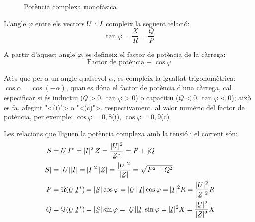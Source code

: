 \begin{figure}[htb]
\centering
{}
\caption{Pot\`{e}ncia complexa monof\`{a}sica} \label{pic:pot_comp_mono}
\end{figure}

L'angle $\varphi$ entre els vectors $\cmplx{U}$ i $\cmplx{I}$ compleix la seg\"{u}ent relaci\'{o}:
\begin{equation}
   \tan\varphi = \frac{X}{R} = \frac{Q}{P}
\end{equation}

A partir d'aquest angle $\varphi$, es defineix el factor de pot\`{e}ncia de la c\`{a}rrega:
\begin{equation}
   \text{Factor de pot\`{e}ncia} \equiv \cos\varphi
\end{equation}

At\`{e}s que per a un angle qualsevol $\alpha$, es compleix la igualtat
trigonom\`{e}trica: $\cos\alpha = \cos(-\alpha)$, quan es d\'{o}na el factor
de pot\`{e}ncia d'una c\`{a}rrega, cal especificar si \'{e}s inductiu ($Q>0,
\tan\varphi>0$) o capacitiu ($Q<0, \tan\varphi<0$); aix\`{o} es fa,
afegint {"<}(i){">} o {"<}(c){">}, respectivament, al valor num\`{e}ric del factor
de pot\`{e}ncia, per exemple: $\cos\varphi=0,8$(i),
$\cos\varphi=0,9$(c).

Les relacions que lliguen la pot\`{e}ncia complexa amb la tensi\'{o} i el corrent s\'{o}n:
\begin{align}
   \cmplx{S} &=  \cmplx{U} \,\cmplx{I}^* =
   |\cmplx{I}|^2 \,\cmplx{Z} = \frac{|\cmplx{U}|^2}{\cmplx{Z}^*} =
   P + \ju Q \label{eq:s_mono1}\\
   |\cmplx{S}| &= |\cmplx{U}| |\cmplx{I}| =
   |\cmplx{I}|^2 \,|\cmplx{Z}| = \frac{|\cmplx{U}|^2}{|\cmplx{Z}|} =
   \sqrt{P^2+Q^2} \\
   P &= \Re (\cmplx{U} \, \cmplx{I}^*) = |\cmplx{S}| \cos\varphi =
   |\cmplx{U}| |\cmplx{I}| \cos\varphi = |\cmplx{I}|^2 R =
   \frac{|\cmplx{U}|^2}{|\cmplx{Z}|^2}R\\
   Q &= \Im (\cmplx{U} \, \cmplx{I}^*) = |\cmplx{S}| \sin\varphi =
   |\cmplx{U}| |\cmplx{I}|\sin\varphi  = |\cmplx{I}|^2 X =
   \frac{|\cmplx{U}|^2}{|\cmplx{Z}|^2}X
\end{align}

